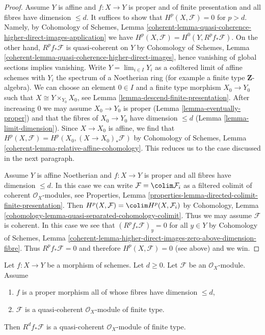 \begin{proof}
\medskip\noindent
Assume $Y$ is affine and $f : X \to Y$ is proper and of finite presentation
and all fibres have dimension $\leq d$. It suffices to show that
$H^p(X, \mathcal{F}) = 0$ for $p > d$. Namely, by
Cohomology of Schemes, Lemma
\ref{coherent-lemma-quasi-coherence-higher-direct-images-application}
we have $H^p(X, \mathcal{F}) = H^0(Y, R^pf_*\mathcal{F})$.
On the other hand, $R^pf_*\mathcal{F}$ is quasi-coherent on $Y$
by Cohomology of Schemes, Lemma
\ref{coherent-lemma-quasi-coherence-higher-direct-images},
hence vanishing of global sections implies vanishing.
Write $Y = \lim_{i \in I} Y_i$ as a cofiltered limit of affine schemes
with $Y_i$ the spectrum of a Noetherian ring
(for example a finite type $\mathbf{Z}$-algebra).
We can choose an element $0 \in I$ and a finite type morphism
$X_0 \to Y_0$ such that $X \cong Y \times_{Y_0} X_0$, see
Lemma \ref{lemma-descend-finite-presentation}.
After increasing $0$ we may assume $X_0 \to Y_0$ is proper
(Lemma \ref{lemma-eventually-proper})
and that the fibres of $X_0 \to Y_0$ have dimension $\leq d$
(Lemma \ref{lemma-limit-dimension}).
Since $X \to X_0$ is affine, we find that
$H^p(X, \mathcal{F}) = H^p(X_0, (X \to X_0)_*\mathcal{F})$ by
Cohomology of Schemes, Lemma \ref{coherent-lemma-relative-affine-cohomology}.
This reduces us to the case discussed in the next paragraph.

\medskip\noindent
Assume $Y$ is affine Noetherian and $f : X \to Y$ is proper
and all fibres have dimension $\leq d$.
In this case we can write $\mathcal{F} = \colim \mathcal{F}_i$
as a filtered colimit of coherent $\mathcal{O}_X$-modules, see
Properties, Lemma
\ref{properties-lemma-directed-colimit-finite-presentation}.
Then $H^p(X, \mathcal{F}) = \colim H^p(X, \mathcal{F}_i)$ by
Cohomology, Lemma \ref{cohomology-lemma-quasi-separated-cohomology-colimit}.
Thus we may assume $\mathcal{F}$ is coherent.
In this case we see that $(R^pf_*\mathcal{F})_y = 0$ for
all $y \in Y$ by Cohomology of Schemes, Lemma
\ref{coherent-lemma-higher-direct-images-zero-above-dimension-fibre}.
Thus $R^pf_*\mathcal{F} = 0$ and therefore
$H^p(X, \mathcal{F}) = 0$ (see above) and we win.
\end{proof}

\begin{lemma}
\label{lemma-proper-top-cohomology-finite-type}
Let $f : X \to Y$ be a morphism of schemes. Let $d \geq 0$. Let $\mathcal{F}$
be an $\mathcal{O}_X$-module. Assume
\begin{enumerate}
\item $f$ is a proper morphism all of whose fibres have dimension $\leq d$,
\item $\mathcal{F}$ is a quasi-coherent $\mathcal{O}_X$-module of finite type.
\end{enumerate}
Then $R^df_*\mathcal{F}$ is a quasi-coherent $\mathcal{O}_X$-module
of finite type.
\end{lemma}

